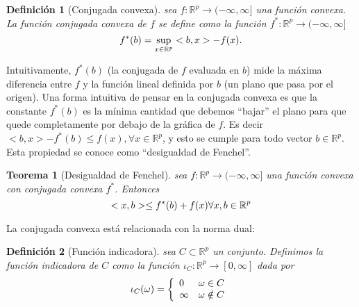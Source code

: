 \documentclass[12pt,draftcls, onecolumn, letterpaper,compsoc]{IEEEtran}
\newtheorem{definition}{\textbf{Definici\'{o}n}}
\newtheorem{theorem}{\textbf{Teorema}}
\begin{document}
\begin{definition}[Conjugada convexa]
    sea $f:\mathbb{R}^{p} \rightarrow (-\infty, \infty]$ una funci\'{o}n convexa. La funci\'{o}n {\it conjugada convexa} de $f$ se define como la funci\'{o}n $f^{*}:\mathbb{R}^{p}\rightarrow (-\infty, \infty]$
    \begin{equation}
        f^{*}(b) = \sup_{x\in\mathbb{R}^{p}}<b, x> - f(x).\\
    \end{equation}
\end{definition}

Intuitivamente, $f^{*}(b)$ (la conjugada de $f$ evaluada en $b$) mide la m\'{a}xima diferencia entre $f$ y la funci\'{o}n lineal definida por $b$ (un plano que pasa por el origen). Una forma intuitiva de pensar en la conjugada convexa es que la constante $f^{*}(b)$ es la m\'{i}nima cantidad que debemos ``bajar'' el plano para que quede completamente por debajo de la gr\'{a}fica de $f$. Es decir $<b, x> - f^{*}(b) \leq f(x),  \forall x\in \mathbb{R}^{p}$, y esto se cumple para todo vector $b\in \mathbb{R}^{p}$. Esta propiedad se conoce como ``desigualdad de Fenchel''.\\

\begin{theorem}[Desigualdad de Fenchel]
    sea $f:\mathbb{R}^{p} \rightarrow (-\infty, \infty]$ una funci\'{o}n convexa con conjugada convexa $f^{*}$. Entonces
    \begin{equation}
        <x, b> \leq f^{*}(b) + f(x) \forall x,b\in \mathbb{R}^{p}\\
    \end{equation}
\end{theorem}

La conjugada convexa est\'{a} relacionada con la norma dual:
\begin{definition}[Funci\'{o}n indicadora]
    sea $C\subset \mathbb{R}^{p}$ un conjunto. Definimos la funci\'{o}n indicadora de $C$ como la funci\'{o}n $\iota_{C}:\mathbb{R}^{p} \rightarrow [0, \infty]$ dada por
    \begin{displaymath}
        \iota_{C}(\omega) = \left\lbrace\begin{array}{ll}
            0   &   \omega \in C\\
            \infty   &   \omega \notin C\\
        \end{array}\right.\\
    \end{displaymath}
\end{definition}
\end{document}
